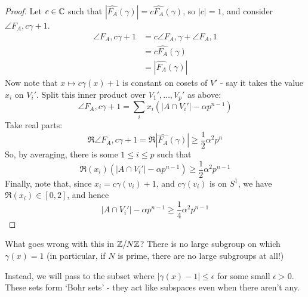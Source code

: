 \documentclass[10pt,a4paper]{article}
\begin{document}
\begin{proof}
  Let $c \in \mathbb{C}$ such that $|\hat{F_A}(\gamma)| = c\hat{F_A}(\gamma)$, so $|c| = 1$, and consider $\angle{F_A, c\gamma+1}$.
  \begin{align*}
    \angle{F_A, c\gamma + 1} &= c \angle{F_A, \gamma} + \angle{F_A, 1}\\
    &= c\hat{F_A}(\gamma)\\
    &= |\hat{F_A}(\gamma)|
  \end{align*}
  Now note that $x \mapsto c\gamma(x)+1$ is constant on cosets of $V'$ - say it takes the value $x_i$ on $V_i'$. Split this inner product over $V_1', \ldots, V_p'$ as above:
  \[\angle{F_A, c\gamma+1} = \sum_i x_i \left(|A \cap V_i'| - \alpha p^{n-1}\right)\]
  Take real parts:
  \[\Re\angle{F_A, c\gamma +1} = \Re |\hat{F_A}(\gamma)| \geq \frac{1}{2}\alpha^2p^n\]
  So, by averaging, there is some $1 \leq i \leq p$ such that
  \[\Re(x_i)\left(|A\cap V_i'| - \alpha p^{n-1}\right) \geq \frac{1}{2}\alpha^2 p^{n-1}\]
  Finally, note that, since $x_i = c\gamma(v_i) +1$, and $c \gamma(v_i)$ is on $S^1$, we have $\Re(x_i) \in [0,2]$, and hence
  \[|A\cap V_i'| - \alpha p^{n-1} \geq \frac{1}{4}\alpha^2 p^{n-1}\]
\end{proof}
What goes wrong with this in $\mathbb{Z}/N\mathbb{Z}$? There is no large subgroup on which $\gamma(x) = 1$ (in particular, if $N$ is prime, there are no large subgroups at all!)

Instead, we will pass to the subset where $|\gamma(x)-1|\leq \epsilon$ for some small $\epsilon > 0$. These sets form `Bohr sets' - they act like subspaces even when there aren't any.
\end{document}
